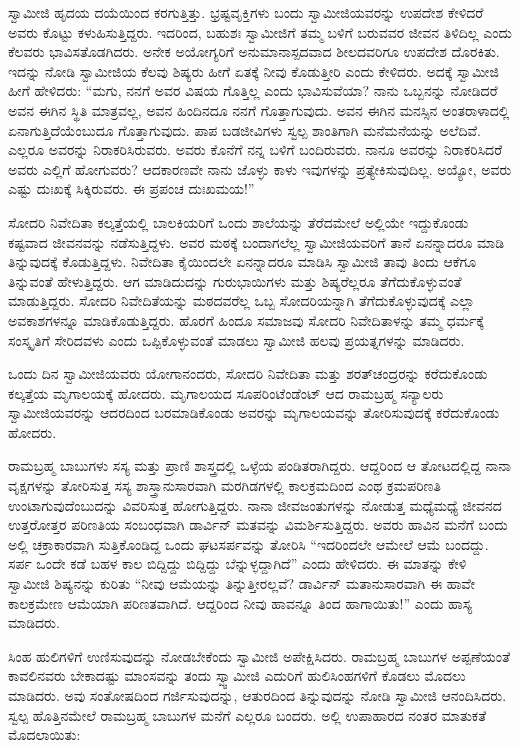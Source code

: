  ಸ್ವಾಮೀಜಿ ಹೃದಯ ದಯೆಯಿಂದ ಕರಗುತ್ತಿತ್ತು. ಭ್ರಷ್ಟವೃಕ್ತಿಗಳು ಬಂದು ಸ್ವಾಮೀಜಿಯವರನ್ನು ಉಪದೇಶ ಕೇಳಿದರೆ ಅವರು ಕೊಟ್ಟು ಕಳುಹಿಸುತ್ತಿದ್ದರು. ಇದರಿಂದ, ಬಹುಶಃ ಸ್ವಾಮೀಜಿಗೆ ತಮ್ಮ ಬಳಿಗೆ ಬರುವವರ ಜೀವನ ತಿಳಿದಿಲ್ಲ ಎಂದು ಕೆಲವರು ಭಾವಿಸತೊಡಗಿದರು. ಅನೇಕ ಅಯೋಗ್ಯರಿಗೆ ಅನುಮಾನಾಸ್ಪದವಾದ ಶೀಲದವರಿಗೂ ಉಪದೇಶ ದೊರಕಿತು. ಇದನ್ನು ನೋಡಿ ಸ್ವಾಮೀಜಿಯ ಕೆಲವು ಶಿಷ್ಯರು ಹೀಗೆ ಏತಕ್ಕೆ ನೀವು ಕೊಡುತ್ತೀರಿ ಎಂದು ಕೇಳಿದರು. ಅದಕ್ಕೆ ಸ್ವಾಮೀಜಿ ಹೀಗೆ ಹೇಳಿದರು: “ಮಗು, ನನಗೆ ಅವರ ವಿಷಯ ಗೊತ್ತಿಲ್ಲ ಎಂದು ಭಾವಿಸುವೆಯಾ? ನಾನು ಒಬ್ಬನನ್ನು ನೋಡಿದರೆ ಅವನ ಈಗಿನ ಸ್ಥಿತಿ ಮಾತ್ರವಲ್ಲ, ಅವನ ಹಿಂದಿನದೂ ನನಗೆ ಗೊತ್ತಾಗುವುದು. ಅವನ ಈಗಿನ ಮನಸ್ಸಿನ ಅಂತರಾಳಾದಲ್ಲಿ ಏನಾಗುತ್ತಿದೆಯೆಂಬುದೂ ಗೊತ್ತಾಗುವುದು. ಪಾಪ ಬಡಜೀವಿಗಳು ಸ್ವಲ್ಪ ಶಾಂತಿಗಾಗಿ ಮನೆಮನೆಯನ್ನು ಅಲೆದಿವೆ. ಎಲ್ಲರೂ ಅವರನ್ನು ನಿರಾಕರಿಸಿರುವರು. ಅವರು ಕೊನೆಗೆ ನನ್ನ ಬಳಿಗೆ ಬಂದಿರುವರು. ನಾನೂ ಅವರನ್ನು ನಿರಾಕರಿಸಿದರೆ ಅವರು ಎಲ್ಲಿಗೆ ಹೋಗುವರು? ಆದಕಾರಣವೇ ನಾನು ಜೊಳ್ಳು ಕಾಳು ಇವುಗಳನ್ನು ಪ್ರತ್ಯೇಕಿಸುವುದಿಲ್ಲ. ಅಯ್ಯೋ, ಅವರು ಎಷ್ಟು ದುಃಖಕ್ಕೆ ಸಿಕ್ಕಿರುವರು. ಈ ಪ್ರಪಂಚ ದುಃಖಮಯ!” 

 ಸೋದರಿ ನಿವೇದಿತಾ ಕಲ್ಕತ್ತೆಯಲ್ಲಿ ಬಾಲಕಿಯರಿಗೆ ಒಂದು ಶಾಲೆಯನ್ನು ತೆರೆದಮೇಲೆ ಅಲ್ಲಿಯೇ ಇದ್ದುಕೊಂಡು ಕಷ್ಟವಾದ ಜೀವನವನ್ನು ನಡೆಸುತ್ತಿದ್ದಳು. ಅವರ ಮಠಕ್ಕೆ ಬಂದಾಗಲೆಲ್ಲ ಸ್ವಾಮೀಜಿಯವರಿಗೆ ತಾನೆ ಏನನ್ನಾದರೂ ಮಾಡಿ ತಿನ್ನುವುದಕ್ಕೆ ಕೊಡುತ್ತಿದ್ದಳು. ನಿವೇದಿತಾ ಕೈಯಿಂದಲೇ ಏನನ್ನಾದರೂ ಮಾಡಿಸಿ ಸ್ವಾಮೀಜಿ ತಾವು ತಿಂದು ಆಕೆಗೂ ತಿನ್ನುವಂತೆ ಹೇಳುತ್ತಿದ್ದರು. ಆಗ ಮಾಡಿದುದನ್ನು ಗುರುಭಾಯಿಗಳು ಮತ್ತು ಶಿಷ್ಯರೆಲ್ಲರೂ ತೆಗೆದುಕೊಳ್ಳುವಂತೆ ಮಾಡುತ್ತಿದ್ದರು. ಸೋದರಿ ನಿವೇದಿತೆಯನ್ನು ಮಠದವರೆಲ್ಲ ಒಬ್ಬ ಸೋದರಿಯನ್ನಾಗಿ ತೆಗೆದುಕೊಳ್ಳುವುದಕ್ಕೆ ಎಲ್ಲಾ ಅವಕಾಶಗಳನ್ನೂ ಮಾಡಿಕೊಡುತ್ತಿದ್ದರು. ಹೊರಗೆ ಹಿಂದೂ‌ ಸಮಾಜವು ಸೋದರಿ ನಿವೇದಿತಾಳನ್ನು ತಮ್ಮ ಧರ್ಮಕ್ಕೆ ಸಂಸ್ಕೃತಿಗೆ ಸೇರಿದವಳು ಎಂದು ಒಪ್ಪಿಕೊಳ್ಳುವಂತೆ ಮಾಡಲು ಸ್ವಾಮೀಜಿ ಹಲವು ಪ್ರಯತ್ನಗಳನ್ನು ಮಾಡಿದರು. 

 ಒಂದು ದಿನ ಸ್ವಾಮೀಜಿಯವರು ಯೋಗಾನಂದರು, ಸೋದರಿ ನಿವೇದಿತಾ ಮತ್ತು ಶರತ್‍ಚಂದ್ರರನ್ನು ಕರೆದುಕೊಂಡು ಕಲ್ಕತ್ತೆಯ ಮೃಗಾಲಯಕ್ಕೆ ಹೋದರು. ಮೃಗಾಲಯದ ಸೂಪರಿಂಟೆಂಡೆಂಟ್ ಆದ ರಾಮಬ್ರಹ್ಮ ಸನ್ಯಾಲರು ಸ್ವಾಮೀಜಿಯವರನ್ನು ಆದರದಿಂದ ಬರಮಾಡಿಕೊಂಡು ಅವರನ್ನು ಮೃಗಾಲಯವನ್ನು ತೋರಿಸುವುದಕ್ಕೆ ಕರೆದುಕೊಂಡು ಹೋದರು. 

 ರಾಮಬ್ರಹ್ಮ ಬಾಬುಗಳು ಸಸ್ಯ ಮತ್ತು ಪ್ರಾಣಿ ಶಾಸ್ತ್ರದಲ್ಲಿ ಒಳ್ಳೆಯ ಪಂಡಿತರಾಗಿದ್ದರು. ಆದ್ದರಿಂದ ಆ ತೋಟದಲ್ಲಿದ್ದ ನಾನಾ ವೃಕ್ಷಗಳನ್ನು ತೋರಿಸುತ್ತ ಸಸ್ಯ ಶಾಸ್ತ್ರಾನುಸಾರವಾಗಿ ಮರಗಿಡಗಳಲ್ಲಿ ಕಾಲಕ್ರಮದಿಂದ ಎಂಥ ಕ್ರಮಪರಿಣತಿ ಉಂಟಾಗುವುದೆಂಬುದನ್ನು ವಿವರಿಸುತ್ತ ಹೋಗುತ್ತಿದ್ದರು. ನಾನಾ ಜೀವಜಂತುಗಳನ್ನು ನೋಡುತ್ತ ಮಧ್ಯೆಮಧ್ಯೆ ಜೀವನದ ಉತ್ತರೋತ್ತರ ಪರಿಣತಿಯ ಸಂಬಂಧವಾಗಿ ಡಾರ್ವಿನ್ ಮತವನ್ನು ವಿಮರ್ಶಿಸುತ್ತಿದ್ದರು. ಅವರು ಹಾವಿನ ಮನೆಗೆ ಬಂದು ಅಲ್ಲಿ ಚಕ್ರಾಕಾರವಾಗಿ ಸುತ್ತಿಕೊಂಡಿದ್ದ ಒಂದು ಘಟಸರ್ಪವನ್ನು ತೋರಿಸಿ “ಇದರಿಂದಲೇ ಆಮೇಲೆ ಆಮೆ ಬಂದದ್ದು. ಸರ್ಪ ಒಂದೇ ಕಡೆ ಬಹಳ ಕಾಲ ಬಿದ್ದಿದ್ದು ಬಿದ್ದಿದ್ದು ಬೆನ್ನುಳ್ಳದ್ದಾಗಿದೆ” ಎಂದು ಹೇಳಿದರು. ಈ ಮಾತನ್ನು ಕೇಳಿ ಸ್ವಾಮೀಜಿ ಶಿಷ್ಯನನ್ನು ಕುರಿತು “ನೀವು ಆಮೆಯನ್ನು ತಿನ್ನುತ್ತೀರಲ್ಲವೆ? ಡಾರ್ವಿನ್ ಮತಾನುಸಾರವಾಗಿ ಈ ಹಾವೇ ಕಾಲಕ್ರಮೇಣ ಆಮೆಯಾಗಿ ಪರಿಣತವಾಗಿದೆ. ಆದ್ದರಿಂದ ನೀವು ಹಾವನ್ನೂ ತಿಂದ ಹಾಗಾಯಿತು!” ಎಂದು ಹಾಸ್ಯ ಮಾಡಿದರು. 

 ಸಿಂಹ ಹುಲಿಗಳಿಗೆ ಉಣಿಸುವುದನ್ನು ನೋಡಬೇಕೆಂದು ಸ್ವಾಮೀಜಿ ಅಪೇಕ್ಷಿಸಿದರು. ರಾಮಬ್ರಹ್ಮ ಬಾಬುಗಳ ಅಪ್ಪಣೆಯಂತೆ ಕಾವಲಿನವರು ಬೇಕಾದಷ್ಟು ಮಾಂಸವನ್ನು ತಂದು ಸ್ವ್ವಾಮೀಜಿ ಎದುರಿಗೆ ಹುಲಿಸಿಂಹಗಳಿಗೆ ಕೊಡಲು ಮೊದಲು ಮಾಡಿದರು. ಅವು ಸಂತೋಷದಿಂದ ಗರ್ಜಿಸುವುದನ್ನು, ಆತುರದಿಂದ ತಿನ್ನುವುದನ್ನು ನೋಡಿ ಸ್ವಾಮೀಜಿ ಆನಂದಿಸಿದರು. ಸ್ವಲ್ಪ ಹೊತ್ತಿನಮೇಲೆ ರಾಮಬ್ರಹ್ಮ ಬಾಬುಗಳ ಮನೆಗೆ ಎಲ್ಲರೂ ಬಂದರು. ಅಲ್ಲಿ ಉಪಾಹಾರದ ನಂತರ ಮಾತುಕತೆ ಮೊದಲಾಯಿತು: 

